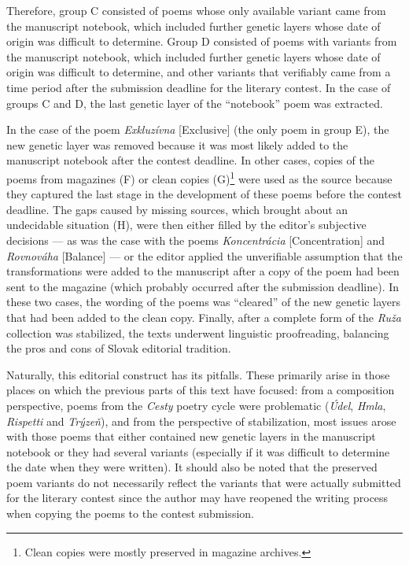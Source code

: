 \documentclass{article}
\begin{document}
Therefore, group C consisted of poems whose only available variant came from the manuscript notebook, which included further genetic layers whose date of origin was difficult to determine. Group D consisted of poems with variants from the manuscript notebook, which included further genetic layers whose date of origin was difficult to determine, and other variants that verifiably came from a time period after the submission deadline for the literary contest. In the case of groups C and D, the last genetic layer of the ``notebook'' poem was extracted.

In the case of the poem \emph{Exkluzívna} [Exclusive] (the only poem
in group E), the new genetic layer was removed because it was most
likely added to the manuscript notebook after the contest deadline. In
other cases, copies of the poems from magazines (F) or clean copies
(G)\footnote{Clean copies were mostly preserved in magazine archives.}
were used as the source because they captured the last stage in the
development of these poems before the contest deadline. The gaps caused
by missing sources, which brought about an undecidable situation (H),
were then either filled by the editor's subjective decisions –– as was
the case with the poems \emph{Koncentrácia} [Concentration]
and \emph{Rovnováha} [Balance] –– or the editor applied the unverifiable
assumption that the transformations were added to the manuscript after
a copy of the poem had been sent to the magazine (which probably
occurred after the submission deadline). In these two cases, the wording
of the poems was ``cleared'' of the new genetic layers that had been
added to the clean copy. Finally, after a complete form of the
\emph{Ruža} collection was stabilized, the texts underwent linguistic
proofreading, balancing the pros and cons of Slovak editorial tradition.

Naturally, this editorial construct has its pitfalls. These primarily
arise in those places on which the previous parts of this text have
focused: from a composition perspective, poems from the \emph{Cesty}
poetry cycle were problematic (\emph{Údel}, \emph{Hmla}, \emph{Rispetti}
and \emph{Trýzeň}), and from the perspective of stabilization, most
issues arose with those poems that either contained new genetic layers
in the manuscript notebook or they had several variants (especially if
it was difficult to determine the date when they were written). It
should also be noted that the preserved poem variants do not necessarily
reflect the variants that were actually submitted for the literary
contest since the author may have reopened the writing process when
copying the poems to the contest submission.
\end{document}
